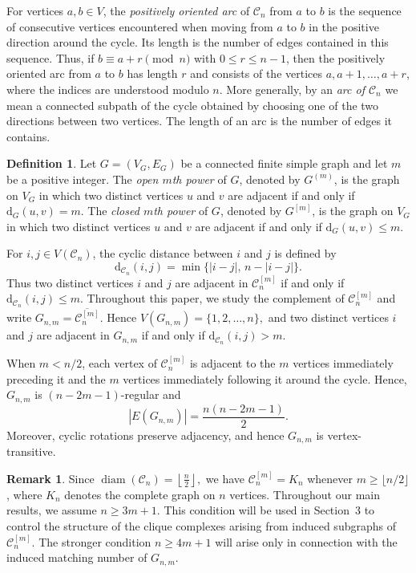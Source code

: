 \documentclass[12pt,reqno]{amsart}
\theoremstyle{definition}
\newtheorem{definition}{Definition}
\newtheorem{remark}{Remark}
\numberwithin{equation}{section}
\def\C{\mathcal{C}}
\begin{document}
For vertices $a,b\in V$, the \emph{positively oriented arc} of $\C_n$
from $a$ to $b$ is the sequence of consecutive vertices encountered
when moving from $a$ to $b$ in the positive direction around the cycle.
Its length is the number of edges contained in this sequence. Thus, if $b\equiv a+r\pmod n$ with $0\leq r\leq n-1$, then the positively oriented arc from $a$ to $b$ has length $r$ and consists of the vertices $a,a+1,\ldots,a+r$,
where the indices are understood modulo $n$. More generally, by an \emph{arc of $\C_n$} we mean a connected subpath
of the cycle obtained by choosing one of the two directions between two
vertices. The length of an arc is the number of edges it contains.

\begin{definition}
	Let $G=(V_G,E_G)$ be a connected finite simple graph and let $m$ be a
	positive integer. The \emph{open $m$th power} of $G$, denoted by
	$G^{(m)}$, is the graph on $V_G$ in which two distinct vertices $u$
	and $v$ are adjacent if and only if
	\( \mathrm d_G(u,v)=m. \)
	The \emph{closed $m$th power} of $G$, denoted by $G^{[m]}$, is the
	graph on $V_G$ in which two distinct vertices $u$ and $v$ are adjacent
	if and only if
	\( \mathrm d_G(u,v)\leq m. \)
\end{definition}
For $i,j\in V(\C_n)$, the cyclic distance between $i$ and $j$ is defined by
\[
\mathrm d_{\C_n}(i,j)
=
\min\{|i-j|,\,n-|i-j|\}.
\]
Thus two distinct vertices $i$ and $j$ are adjacent in
$\C_n^{[m]}$ if and only if \(\mathrm d_{\C_n}(i,j)\leq m.\)
Throughout this paper, we study the complement of $\C_n^{[m]}$ and write \( G_{n,m}=\overline{\C_n^{[m]}}. \)
Hence \( V(G_{n,m})=\{1,2,\ldots,n\}, \)
and two distinct vertices $i$ and $j$ are adjacent in $G_{n,m}$ if
and only if \( \mathrm d_{\C_n}(i,j)>m. \)

When $m<n/2$, each vertex of $\C_n^{[m]}$ is adjacent to the $m$
vertices immediately preceding it and the $m$ vertices immediately
following it around the cycle. Hence, $G_{n,m}$ is
$(n-2m-1)$-regular and
\[
|E(G_{n,m})|
=
\frac{n(n-2m-1)}{2}.
\]
Moreover, cyclic rotations preserve adjacency, and hence $G_{n,m}$ is
vertex-transitive.


\begin{remark}
	Since \( 	\operatorname{diam}(\C_n)=\left\lfloor\frac{n}{2}\right\rfloor, \)
	we have $\C_n^{[m]}=K_n$ whenever
	$m\geq\lfloor n/2\rfloor$, where $K_n$ denotes the complete graph on
	$n$ vertices. Throughout our main results, we assume $n\geq3m+1$.
	This condition will be used in Section~3 to control the structure of
	the clique complexes arising from induced subgraphs of
	$\C_n^{[m]}$. The stronger condition $n\geq4m+1$ will arise only in
	connection with the induced matching number of $G_{n,m}$.
\end{remark}
\end{document}
